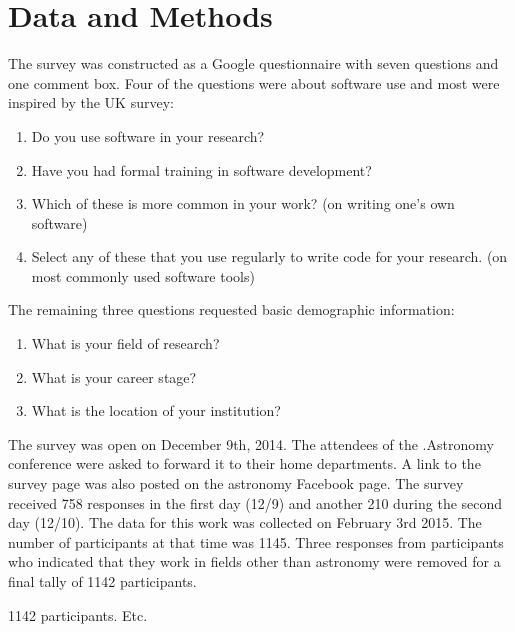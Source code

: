 \section{Data and Methods}

The survey was constructed as a Google questionnaire with seven questions and one comment box. Four of the questions were about software use and most were inspired by the UK survey:
\begin{enumerate}
\item Do you use software in your research?
\item Have you had formal training in software development?
\item Which of these is more common in your work? (on writing one's own software)
\item Select any of these that you use regularly to write code for your research. (on most commonly used software tools)
\end{enumerate}
The remaining three questions requested basic demographic information:
\begin{enumerate}
\item What is your field of research?
\item What is your career stage?
\item What is the location of your institution?
\end{enumerate}

The survey was open on December 9th, 2014. The attendees of the .Astronomy conference were asked to forward it to their home departments. A link to the survey page was also posted on the astronomy Facebook page. The survey received 758 responses in the first day (12/9) and another 210 during the second day (12/10). The data for this work was collected on February 3rd 2015. The number of participants at that time was 1145. Three responses from participants who indicated that they work in fields other than astronomy were removed for a final tally of 1142 participants. 



1142 participants. Etc.